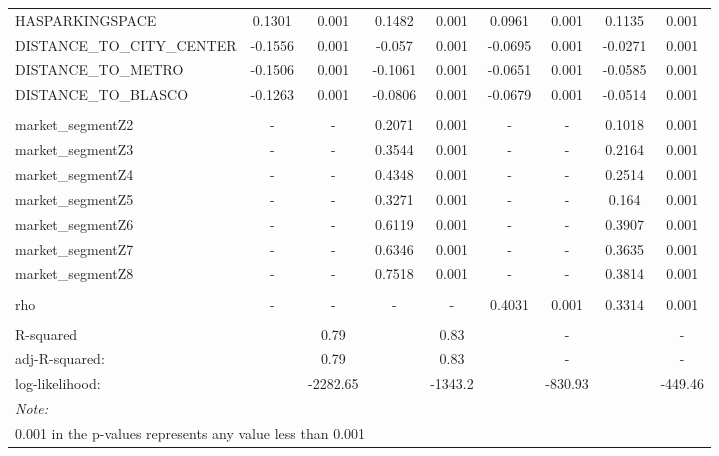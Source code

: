 \documentclass[Royal,times,sageh]{sagej}
\begin{document}
\begin{table}
{\begin{tabular}[t]{lcccccccc}
\hspace{1em}HASPARKINGSPACE & 0.1301 & 0.001 & 0.1482 & 0.001 & 0.0961 & 0.001 & 0.1135 & 0.001\\
\hspace{1em}DISTANCE\_TO\_CITY\_CENTER & -0.1556 & 0.001 & -0.057 & 0.001 & -0.0695 & 0.001 & -0.0271 & 0.001\\
\hspace{1em}DISTANCE\_TO\_METRO & -0.1506 & 0.001 & -0.1061 & 0.001 & -0.0651 & 0.001 & -0.0585 & 0.001\\
\hspace{1em}DISTANCE\_TO\_BLASCO & -0.1263 & 0.001 & -0.0806 & 0.001 & -0.0679 & 0.001 & -0.0514 & 0.001\\
\addlinespace[0.3em]
\multicolumn{9}{l}{\textbf{Market segments}}\\
\hspace{1em}market\_segmentZ2 & - & - & 0.2071 & 0.001 & - & - & 0.1018 & 0.001\\
\hspace{1em}market\_segmentZ3 & - & - & 0.3544 & 0.001 & - & - & 0.2164 & 0.001\\
\hspace{1em}market\_segmentZ4 & - & - & 0.4348 & 0.001 & - & - & 0.2514 & 0.001\\
\hspace{1em}market\_segmentZ5 & - & - & 0.3271 & 0.001 & - & - & 0.164 & 0.001\\
\hspace{1em}market\_segmentZ6 & - & - & 0.6119 & 0.001 & - & - & 0.3907 & 0.001\\
\hspace{1em}market\_segmentZ7 & - & - & 0.6346 & 0.001 & - & - & 0.3635 & 0.001\\
\hspace{1em}market\_segmentZ8 & - & - & 0.7518 & 0.001 & - & - & 0.3814 & 0.001\\
\addlinespace[0.3em]
\multicolumn{9}{l}{\textbf{Spatial lag parameter}}\\
\hspace{1em}rho & - & - & - & - & 0.4031 & 0.001 & 0.3314 & 0.001\\
\addlinespace[0.3em]
\multicolumn{9}{l}{\textbf{Model diagnostics}}\\
\hspace{1em}R-squared &  & 0.79 &  & 0.83 &  & - &  & -\\
\hspace{1em}adj-R-squared: &  & 0.79 &  & 0.83 &  & - &  & -\\
\hspace{1em}log-likelihood: &  & -2282.65 &  & -1343.2 &  & -830.93 &  & -449.46\\
\bottomrule
\multicolumn{9}{l}{\rule{0pt}{1em}\textit{Note: }}\\
\multicolumn{9}{l}{\rule{0pt}{1em}0.001 in the p-values represents any value less than 0.001}\\
\end{tabular}}
\end{table}
\end{document}
